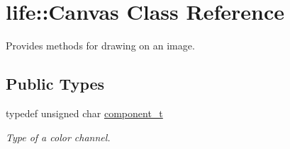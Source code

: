 \hypertarget{classlife_1_1_canvas}{}\section{life\+::Canvas Class Reference}
\label{classlife_1_1_canvas}


Provides methods for drawing on an image.  


\subsection*{Public Types}
\begin{DoxyCompactItemize}
\item 
typedef unsigned char \mbox{\hyperlink{classlife_1_1_canvas_aa0de8894cefde751c08728d25e75a911}{component\+\_\+t}}
\begin{DoxyCompactList}\small\item\em Type of a color channel. \end{DoxyCompactList}\end{DoxyCompactItemize}
